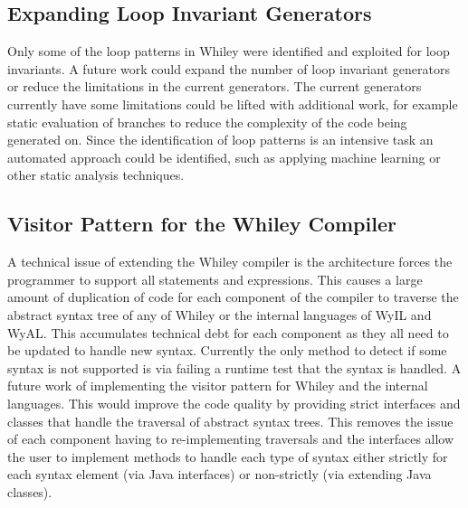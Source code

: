 \subsection{Expanding Loop Invariant Generators}

Only some of the loop patterns in Whiley were identified and exploited for loop
invariants.
A future work could expand the number of loop invariant generators or reduce
the limitations in the current generators.
The current generators currently have some limitations could be lifted with
additional work, for example static evaluation of branches to reduce the
complexity of the code being generated on.
Since the identification of loop patterns is an intensive task an automated
approach could be identified, such as applying machine learning or other static
analysis techniques.

\subsection{Visitor Pattern for the Whiley Compiler}

A technical issue of extending the Whiley compiler is the architecture forces
the programmer to support all statements and expressions.
This causes a large amount of duplication of code for each component of the
compiler to traverse the abstract syntax tree of any of Whiley or the internal
languages of WyIL and WyAL.
This accumulates technical debt for each component as they all need to be
updated to handle new syntax.
Currently the only method to detect if some syntax is not supported is via 
failing a runtime test that the syntax is handled.
A future work of implementing the visitor pattern for Whiley and the internal
languages.
This would improve the code quality by providing strict interfaces and
classes that handle the traversal of abstract syntax trees.
This removes the issue of each component having to re-implementing traversals
and the interfaces allow the user to implement methods to handle each type of
syntax either strictly for each syntax element (via Java interfaces) or
non-strictly (via extending Java classes).


